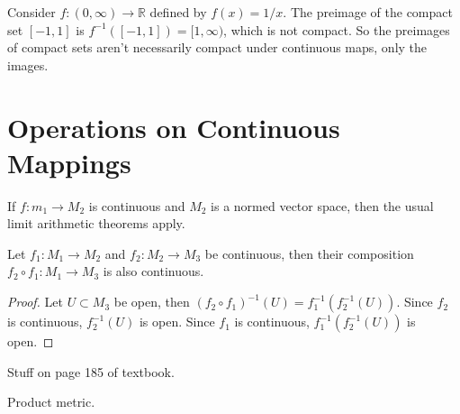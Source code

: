 \documentclass[10pt]{report}
\begin{document}
\begin{ex}{}{}
	Consider $f:(0,\infty) \to \mathbb{R}$ defined by $f(x) = 1/x$. The preimage of the compact set $[-1,1]$ is $f^{-1}([-1,1]) = [1,\infty)$, which is not compact. So the preimages of compact sets aren't necessarily compact under continuous maps, only the images.
\end{ex}



\section{Operations on Continuous Mappings}

If $f:m_1\to M_2$ is continuous and $M_2$ is a normed vector space, then the usual limit arithmetic theorems apply.

\begin{prop}
	\label{comp-cts}
	Let $f_1:M_1 \to M_2$ and $f_2:M_2 \to M_3$ be continuous, then their composition $f_2 \circ f_1: M_1 \to M_3$ is also continuous.
\end{prop}
\begin{proof}
	Let $U \subset M_3$ be open, then $(f_2 \circ f_1)^{-1}(U) = f_1^{-1}(f_2^{-1}(U))$. Since $f_2$ is continuous, $f_2^{-1}(U)$ is open. Since $f_1$ is continuous, $f_1^{-1}(f_2^{-1}(U))$ is open.
\end{proof}

{\color{red}Stuff on page 185 of textbook.}

{\color{red}Product metric.}
\end{document}
